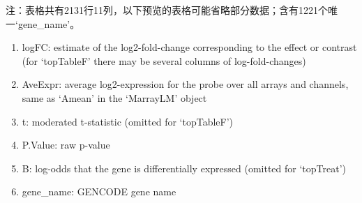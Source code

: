 \documentclass[
]{article}
\providecommand{\tightlist}{%
  \setlength{\itemsep}{0pt}\setlength{\parskip}{0pt}}
\begin{document}
\begin{center}\begin{tcolorbox}[colback=gray!10, colframe=gray!50, width=0.9\linewidth, arc=1mm, boxrule=0.5pt]注：表格共有2131行11列，以下预览的表格可能省略部分数据；含有1221个唯一`gene\_name'。
\end{tcolorbox}
\end{center}
\begin{center}\begin{tcolorbox}[colback=gray!10, colframe=gray!50, width=0.9\linewidth, arc=1mm, boxrule=0.5pt]\begin{enumerate}\tightlist
\item logFC:  estimate of the log2-fold-change corresponding to the effect or contrast (for ‘topTableF’ there may be several columns of log-fold-changes)
\item AveExpr:  average log2-expression for the probe over all arrays and channels, same as ‘Amean’ in the ‘MarrayLM’ object
\item t:  moderated t-statistic (omitted for ‘topTableF’)
\item P.Value:  raw p-value
\item B:  log-odds that the gene is differentially expressed (omitted for ‘topTreat’)
\item gene\_name:  GENCODE gene name
\end{enumerate}\end{tcolorbox}
\end{center}
\end{document}
